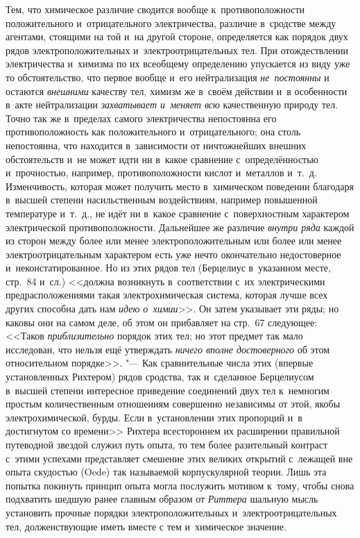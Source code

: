 Тем, что химическое различие сводится вообще к~противоположности положительного
и~отрицательного электричества, различие в~сродстве между агентами, стоящими на
той и~на другой стороне, определяется как порядок двух рядов
электроположительных и~электроотрицательных тел. При отождествлении
электричества и~химизма по их всеобщему определению упускается из виду уже то
обстоятельство, что первое вообще и~его нейтрализация {\em не~постоянны} и
остаются {\em внешними} качеству тел, химизм же в~своём действии и~в
особенности в~акте нейтрализации {\em захватывает и~меняет всю} качественную
природу тел. Точно так же в~пределах самого электричества непостоянна его
противоположность как положительного и~отрицательного; она столь непостоянна,
что находится в~зависимости от ничтожнейших внешних обстоятельств и~не может
идти ни в~какое сравнение с~определённостью и~прочностью, например,
противоположности кислот и~металлов и~т.~д. Изменчивость, которая может
получить место в~химическом поведении благодаря в~высшей степени насильственным
воздействиям, например повышенной температуре и~т.~д., не идёт ни в~какое
сравнение с~поверхностным характером электрической противоположности.
Дальнейшее же различие {\em внутри ряда} каждой из сторон между более или менее
электроположительным или более или менее электроотрицательным характером есть
уже нечто окончательно недостоверное и~неконстатированное. Но из этих рядов тел
(Берцелиус в~указанном месте, стр.~84 и~сл.) <<должна возникнуть в~соответствии
с~их электрическими предрасположениями такая электрохимическая система, которая
лучше всех других способна дать нам {\em идею о~химии}>>. Он затем указывает
эти ряды; но каковы они на самом деле, об этом он прибавляет на стр.~67
следующее: <<Таков {\em приблизительно} порядок этих тел; но этот предмет так
мало исследован, что нельзя ещё утверждать {\em ничего вполне достоверного} об
этом относительном порядке>>. "--- Как сравнительные числа этих (впервые
установленных Рихтером) рядов сродства, так и~сделанное Берцелиусом в~высшей
степени интересное приведение соединений двух тел к~немногим простым
количественным отношениям совершенно независимы от этой, якобы
электрохимической, бурды. Если в~установлении этих пропорций и~в достигнутом со
времени>> Рихтера всестороннем их расширении правильной путеводной звездой
служил путь опыта, то тем более разительный контраст с~этими успехами
представляет смешение этих великих открытий с~лежащей вне опыта скудостью
(Oede) так называемой корпускулярной теории. Лишь эта попытка покинуть принцип
опыта могла послужить мотивом к~тому, чтобы снова подхватить шедшую ранее
главным образом от {\em Риттера} шальную мысль установить прочные порядки
электроположительных и~электроотрицательных тел, долженствующие иметь вместе с
тем и~химическое значение.

